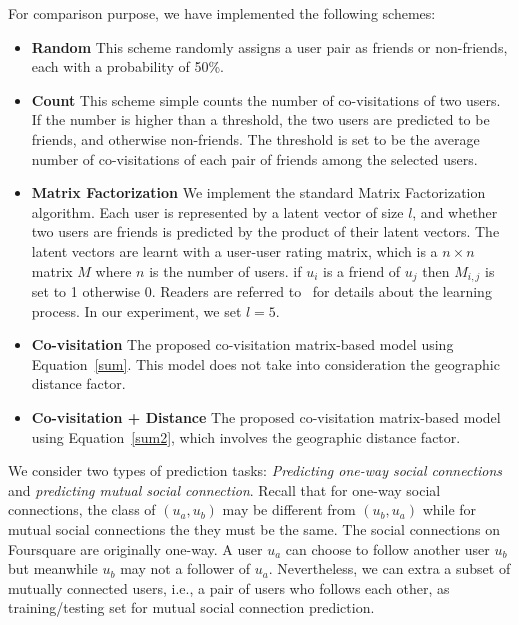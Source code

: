 For comparison purpose, we have implemented the following schemes:
\begin{itemize}
\item \textbf{Random} This scheme randomly assigns a user pair as friends or non-friends, each with a probability of 50\%.

\item \textbf{Count} This scheme simple counts the number of co-visitations of two users. If the number is higher than a threshold, the two users are predicted to be friends, and otherwise non-friends. The threshold is set to be the average number of co-visitations of each pair of friends among the selected users.

\item \textbf{Matrix Factorization} We implement the standard Matrix Factorization~\cite{koren2009matrix} algorithm. Each user is represented by a latent vector of size $l$, and whether two users are friends is predicted by the product of their latent vectors. The latent vectors are learnt with a user-user rating matrix, which is a $n \times n$ matrix $M$ where $n$ is the number of users. if $u_i$ is a friend of $u_j$ then $M_{i,j}$ is set to 1 otherwise 0. Readers are referred to~\cite{koren2009matrix} for details about the learning process. In our experiment, we set $l = 5$.

\item \textbf{Co-visitation} The proposed co-visitation matrix-based model using Equation~\ref{sum}. This model does not take into consideration the geographic distance factor.

\item \textbf{Co-visitation + Distance} The proposed co-visitation matrix-based model using Equation~\ref{sum2}, which involves the geographic distance factor.
\end{itemize}

We consider two types of prediction tasks: \textit{Predicting one-way social connections} and \textit{predicting mutual social connection}. Recall that for one-way social connections, the class of $(u_a, u_b)$ may be different from $(u_b, u_a)$ while for mutual social connections the they must be the same. The social connections on Foursquare are originally one-way. A user $u_a$ can choose to follow another user $u_b$ but meanwhile $u_b$ may not a follower of $u_a$. Nevertheless, we can extra a subset of mutually connected users, i.e., a pair of users who follows each other, as training/testing set for mutual social connection prediction.

